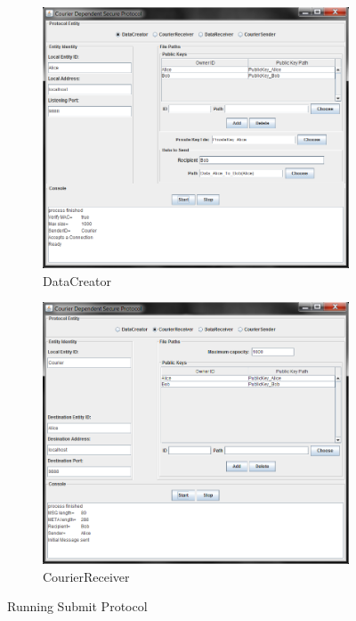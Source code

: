 \begin{figure}[!h]
 \centering
 \begin{subfigure}[b]{0.49\textwidth}
  \includegraphics[width=\textwidth,natwidth=818,natheight=697]{figures/GUIdatacreator.png}
  \caption{DataCreator}
 \end{subfigure}
 \begin{subfigure}[b]{0.49\textwidth}
  \includegraphics[width=\textwidth,natwidth=817,natheight=698]{figures/GUIcourierreceiver.png}
  \caption{CourierReceiver}
 \end{subfigure}
 \caption{Running Submit Protocol} 
\end{figure}

